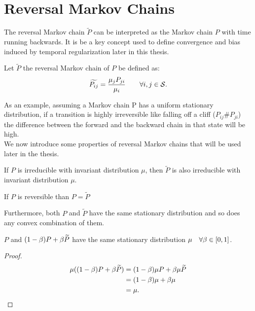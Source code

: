 \section{Reversal Markov Chains}
The reversal Markov chain $\widetilde{P}$ can be interpreted as the Markov chain $P$ with time running backwards. It is be a key concept used to define convergence and bias induced by temporal regularization later in this thesis. \\
\begin{definition}
Let $\widetilde{P}$ the reversal Markov chain of $P$ be defined as:
\begin{equation}
    \widetilde{P_{ij}} = \frac{\mu_j P_{ji}}{\mu_i} \qquad \forall i,j \in \mathcal{S}.
\end{equation}
\end{definition}
As an example, assuming a Markov chain P has a uniform stationary distribution, if a transition is highly irreversible like falling off a cliff ($P_{ij} \# P_{ji}$) the difference between the forward and the backward chain in that state will be high. \\
We now introduce some properties of reversal Markov chains that will be used later in the thesis.
\begin{remark}
If $P$ is irreducible with invariant distribution $\mu$, then $\widetilde{P}$ is also irreducible with invariant distribution $\mu$.
\end{remark}

\begin{remark}
If $P$ is reversible than $P = \widetilde{P}$
\end{remark}
Furthermore, both $P$ and $\widetilde{P}$ have the same stationary distribution and so does any convex combination of them.

\begin{lemma}
$P$ and $(1-\beta) P + \beta \widetilde{P}$ have the same stationary distribution $\mu \quad \forall \beta \in [0,1]$.
\end{lemma}
\begin{proof}
\begin{equation}
    \begin{split}
        \mu ( (1-\beta) P + \beta \widetilde{P}) &=  (1-\beta) \mu P + \beta \mu \widetilde{P} \\
        &= (1-\beta)\mu + \beta \mu\\
        &= \mu.
    \end{split}
\end{equation}
\end{proof}


